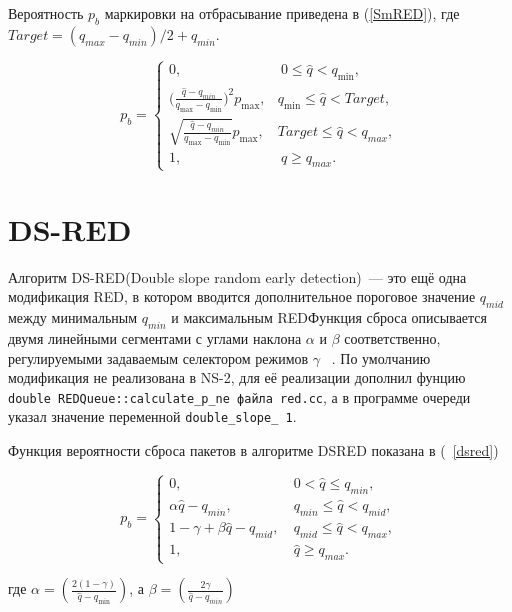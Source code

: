 Вероятность $p_{b}$ маркировки на отбрасывание приведена в (\ref{SmRED}), где $ Target = (q_{max} - q_{min})/2 + q_{min} $.

\begin{equation}
\label{SmRED}
p_{b} = \begin{cases}
        0, &  \ 0 \leqslant \hat{q} < q_{\min},
        \\
        ({\frac{\hat{q} - q_{min}}{q_{\max} - q_{\min}})^2} {p_{\max}}, &  q_{\min} \leqslant  \hat{q} < {Target},
        \\
        \sqrt{{\frac{\hat{q} - q_{min}}{q_{\max} - q_{\min}}}} {p_{\max}}, & {Target} \leqslant  \hat{q} < q_{max},
        \\
        1, &  \ \hat{q} \geqslant q_{max}.
\end{cases}
\end{equation}


\section{DS-RED}
\label{chap2:sec10}


Алгоритм DS-RED(Double slope random early detection)~--- это ещё одна модификация RED, в котором вводится дополнительное пороговое значение $q_{mid}$ между минимальным $q_{min}$ и максимальным
REDФункция сброса описывается двумя линейными сегментами с углами наклона $\alpha $ и $\beta $ соответственно, регулируемыми
задаваемым селектором режимов $\gamma$ ~\cite{DSRED}.  По умолчанию модификация не реализована в NS-2, для её реализации дополнил фунцию \verb|double REDQueue::calculate_p_ne файла red.cc|, а в программе очереди указал значение переменной \verb|double_slope_ 1|. 

Функция вероятности сброса пакетов в алгоритме DSRED показана в (~\ref{dsred})

\begin{equation}
\label{dsred}
p_{b} =\begin{cases}
        0, &  \  0 < \hat{q} \leqslant q_{min}, 
        \\
        \alpha{\hat{q} - q_{min}}, & \ q_{min} \leqslant \hat{q} < q_{mid}, 
        \\
        1 - \gamma + \beta{\hat{q} - q_{mid}}, & \ q_{mid} \leqslant \hat{q} < q_{max}, 
        \\
        1, &  \ \hat{q} \geqslant  q_{max}.
\end{cases}
\end{equation}

где $\alpha = (\frac{2(1 - \gamma)}{\hat{q} - q_{\min}})$, а $\beta = (\frac{2\gamma}{\hat{q} - q_{min}})$


